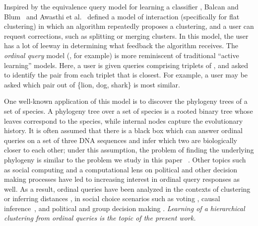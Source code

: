 Inspired by the equivalence query model for learning a classifier
\cite{angluin:1988:queries-concept}, 
Balcan and Blum~\cite{balcan-blum:2008:split-merge}
and Awasthi et al.~\cite{awasthi-zadeh:2010:supervised-clustering,%
awasthi-balcan-voevodski:2017:local-algorithm-journal}
defined a model of interaction (specifically for flat clustering)
in which an algorithm repeatedly proposes a clustering,
and a user can request corrections, such as splitting or merging clusters.
In this model, the user has a lot of leeway in determining
what feedback the algorithm receives.
The \emph{ordinal query} model
(\cite{%
schultz-joachims:2003:relative-comparisons,%
jain-jamieson-nowak:2016:ordinal-embedding,%
vikram-dasgupta:2016:interactive-hierarchical-clustering,%
kendall-gibbons:1990:rank-correlation}, for example)
is more reminiscent of traditional ``active learning'' models.
Here, a user is given queries comprising triplets of \elements,
and asked to identify the pair from each triplet that is closest.
For example, a user may be asked which pair out of
\{lion, dog, shark\} is most similar.

One well-known application of this model
is to discover the phylogeny trees of a set of species.
A phylogeny tree over a set of species
is a rooted binary tree whose leaves correspond to the species,
while internal nodes capture the evolutionary history.
It is often assumed that there is a black box
which can answer ordinal queries on a set of three DNA sequences
and infer which two are biologically closer to each other;
under this assumption,
the problem of finding the underlying phylogeny
is similar to the problem we study in this paper~%
\cite{kannan-lawler-warnow:1996:phylogeny-triplet,%
brown-truszkowski:2011:phylogeny-quartet,%
brown-truszkowski:2011:phylogeny-quartet-practical}.
Other topics such as social computing and a computational lens
on political and other decision making processes have led to
increasing interest in ordinal query responses as well.
As a result, ordinal queries have
been analyzed in the contexts of clustering or inferring distances
\cite{%
schultz-joachims:2003:relative-comparisons,%
agarwal-wills-cayton-lanckriet-kriegman-belongie:2007:embedding,%
tamuz-liu-belongie-shamir-kalai:2011:learning-kernel,%
jain-jamieson-nowak:2016:ordinal-embedding,%
vikram-dasgupta:2016:interactive-hierarchical-clustering},
in social choice scenarios such as voting
\cite{anshelevich-bhardwaj-postl:2015:social-choice,%
anshelevich:2016:ordinal},
causal inference~\cite{pearl-tarsi:1986:strucuting},
and political and group decision making
\cite{goel-lee:2012:triadic,%
goel-lee:2014:small-group-interaction}.
\emph{Learning of a hierarchical clustering
from ordinal queries is the topic of the present work.}

